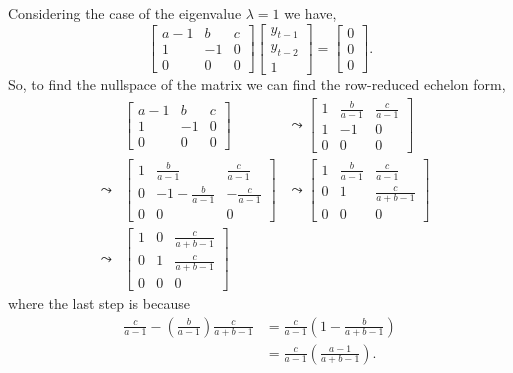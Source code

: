 \documentclass[MathsNotesBase.tex]{subfiles}
\begin{document}
{		
		Considering the case of the eigenvalue ${ \lambda = 1 }$ we have,
		\[
			\begin{bmatrix}
				a-1 &  b & c \\
				1   & -1 & 0 \\
				0   &  0 & 0
			\end{bmatrix}
			\begin{bmatrix}y_{t-1}\\y_{t-2}\\1\end{bmatrix} =
			\begin{bmatrix}0\\0\\0\end{bmatrix}. 
	    \]
	    So, to find the nullspace of the matrix we can find the row-reduced echelon form,
	    \begin{align*}
	    && 	\begin{bmatrix}
		    	a-1 &  b & c \\
		    	1   & -1 & 0 \\
		    	0   &  0 & 0	
		    \end{bmatrix} &\leadsto
		    \begin{bmatrix}
			    1 &  \frac{b}{a-1} & \frac{c}{a-1} \\
			    1   & -1 & 0 \\
			    0   &  0 & 0	
		    \end{bmatrix} \\[4pt]
	    &\leadsto & 
		    \begin{bmatrix}
			    1 &  \frac{b}{a-1} & \frac{c}{a-1} \\
			    0  & -1-\frac{b}{a-1} & -\frac{c}{a-1} \\
			    0   &  0 & 0	
		    \end{bmatrix} &\leadsto 
		    \begin{bmatrix}
			    1 &  \frac{b}{a-1} & \frac{c}{a-1} \\
			    0   & 1 & \frac{c}{a+b-1} \\
			    0   &  0 & 0	
		    \end{bmatrix}  \\[4pt]
		&\leadsto &
			\begin{bmatrix}
				1 & 0 & \frac{c}{a+b-1} \\
				0 & 1 & \frac{c}{a+b-1} \\
				0 & 0 & 0	
			\end{bmatrix}
	    \end{align*}
	    where the last step is because
	  	\begin{align*}
	  	\frac{c}{a-1} - \left(\frac{b}{a-1}\right)\frac{c}{a+b-1} &= \frac{c}{a-1}\left(1 - \frac{b}{a+b-1}\right) \\
	  	&= \frac{c}{a-1}\left(\frac{a-1}{a+b-1}\right). \\
	  	\end{align*} 
	  	
}
\end{document}
